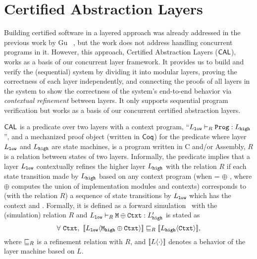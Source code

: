 \section{Certified Abstraction Layers}
\label{chapter:ccal:sec:cal}


Building certified software in a layered approach was already addressed in the previous work by Gu \etal~\cite{deepspec},
but the work does not address handling concurrent programs in it.
However, this approach, Certified Abstraction Layers ($\mathsf{CAL}$), works as a basis of our concurrent layer framework.
It provides us to build and verify the (sequential) system by dividing it into modular layers, 
proving the correctness of each layer independently, and connecting the proofs of all layers in the system to show the correctness of the system's end-to-end behavior via \textit{contextual refinement} between layers. 
It only supports sequential program verification but works as a basis of our concurrent certified abstraction layers.

$\mathsf{CAL}$ is a predicate over two layers with a context program, 
``$L_{{\mathrm{\texttt{low}}}} \vdash_{R} {\mathrm{\texttt{Prog}}} : L_{{\mathrm{\texttt{high}}}}$'', 
and a mechanized proof object (written in $\mathsf{Coq}$) for the predicate where layer $L_{{\mathrm{\texttt{low}}}}$ and $L_{{\mathrm{\texttt{high}}}}$ are state machines,  is a program written in C and/or Assembly, $R$ is a relation between states of two layers.
Informally, the predicate implies that 
a layer $L_{{\mathrm{\texttt{low}}}}$ contextually refines the higher layer $L_{{\mathrm{\texttt{high}}}}$ with the relation $R$
 if each state transition made by $L_{{\mathrm{\texttt{high}}}}$ based on any context program  (when  =  $\oplus$ , where $\oplus$ computes the union of implementation modules and contexts) corresponds to (with the relation $R$)  a sequence of 
 state transitions by $L_{{\mathrm{\texttt{low}}}}$ which has the context  and  .
 Formally, it is defined as a forward simulation~\cite{Lynch95,leroy09,Milner71,Park81} with the (simulation) relation $R$
 and  $L_{{\mathrm{\texttt{low}}}} \vdash_{R} {\mathrm{\texttt{M}}} \oplus {\mathrm{\texttt{Ctxt}}} : L_{{\mathrm{\texttt{high}}}}'$ is stated as
$$\forall\ \codeinmath{Ctxt},\ \sem{L_{\codeinmath{low}}}{\codeinmath{M}_{\codeinmath{high}} \oplus \codeinmath{Ctxt}} \refines_{R} \sem{L_{\codeinmath{high}}}{\codeinmath{Ctxt}},$$
where $\sqsubseteq_{R}$ is a refinement relation with $R$, and $[\![{L} \langle {\cdot} \rangle]\!]$ denotes a  behavior of the layer machine based on $L$.


